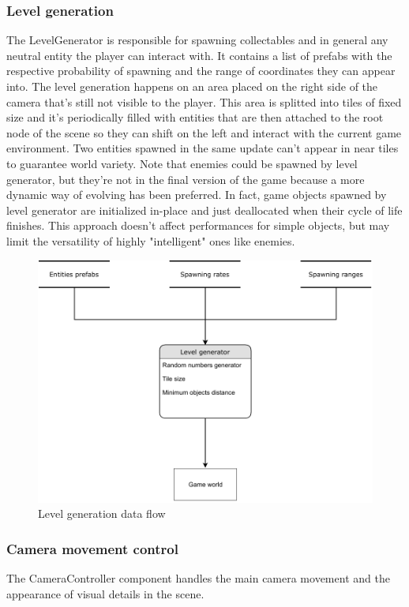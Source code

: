 \documentclass[11pt]{article}
\begin{document}
\subsubsection{Level generation}
The LevelGenerator is responsible for spawning collectables and in general any neutral entity the player can interact with.
It contains a list of prefabs with the respective probability of spawning and the range of coordinates they can appear into.
The level generation happens on an area placed on the right side of the camera that's still not visible to the player.
This area is splitted into tiles of fixed size and it's periodically filled with entities that are then attached to the root node of the scene so they can shift on the left and interact with the current game environment. Two entities spawned in the same update can't appear in near tiles to guarantee world variety.
Note that enemies could be spawned by level generator, but they're not in the final version of the game because a more dynamic way of evolving has been preferred. In fact, game objects spawned by level generator are initialized in-place and just deallocated when their cycle of life finishes. This approach doesn't affect performances for simple objects, but may limit the versatility of highly "intelligent" ones like enemies.

\begin{figure}[H]
  \centering
  \includegraphics[width=1.0\textwidth]{figures/level_generator}
  \caption{Level generation data flow}
\end{figure}

\subsubsection{Camera movement control}
The CameraController component handles the main camera movement and the appearance of visual details in the scene.
\end{document}
